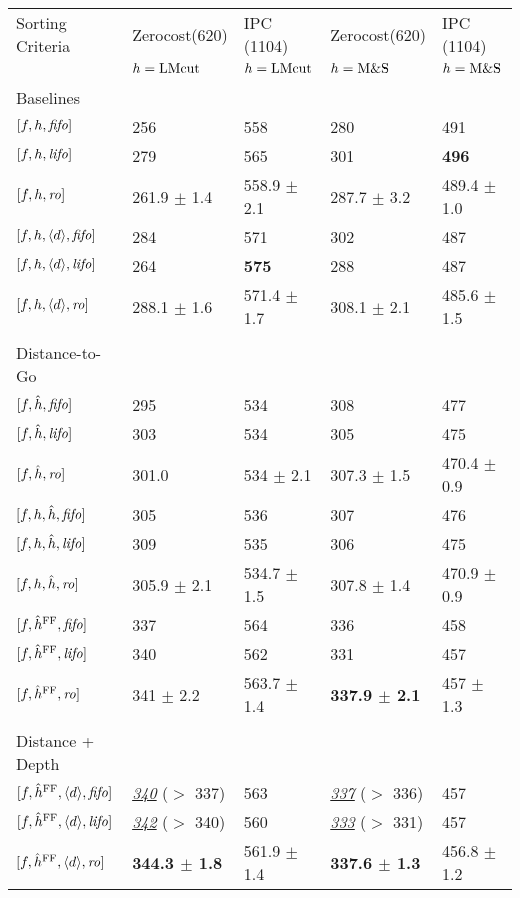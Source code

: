 \begin{center}
\begin{tabular}{|l|ll|ll|}
Sorting Criteria & Zerocost(620) & IPC (1104) & Zerocost(620) & IPC (1104)\\
 & \(h=\text{LMcut}\) & \(h=\text{LMcut}\) & \(h=\text{M\&S}\) & \(h=\text{M\&S}\)\\
 &  &  &  & \\
Baselines &  &  &  & \\
\([f,h,{\text{\textit{fifo}}}]\) & 256 & 558 & 280 & 491\\
\([f,h,{\text{\textit{lifo}}}]\) & 279 & 565 & 301 & \textbf{496}\\
\([f,h,{\text{\textit{ro}}}]\) & 261.9 \(\pm\) 1.4 & 558.9 \(\pm\) 2.1 & 287.7 \(\pm\) 3.2 & 489.4 \(\pm\) 1.0\\
\([f,h,{\left<d\right>},{\text{\textit{fifo}}}]\) & 284 & 571 & 302 & 487\\
\([f,h,{\left<d\right>},{\text{\textit{lifo}}}]\) & 264 & \textbf{575} & 288 & 487\\
\([f,h,{\left<d\right>},{\text{\textit{ro}}}]\) & 288.1 \(\pm\) 1.6 & 571.4 \(\pm\) 1.7 & 308.1 \(\pm\) 2.1 & 485.6 \(\pm\) 1.5\\
 &  &  &  & \\
Distance-to-Go &  &  &  & \\
\([f,\hat{h},{\text{\textit{fifo}}}]\) & 295 & 534 & 308 & 477\\
\([f,\hat{h},{\text{\textit{lifo}}}]\) & 303 & 534 & 305 & 475\\
\([f,\hat{h},{\text{\textit{ro}}}]\) & 301.0 & 534 \(\pm\) 2.1 & 307.3 \(\pm\) 1.5 & 470.4 \(\pm\) 0.9\\
\([f,h,\hat{h},{\text{\textit{fifo}}}]\) & 305 & 536 & 307 & 476\\
\([f,h,\hat{h},{\text{\textit{lifo}}}]\) & 309 & 535 & 306 & 475\\
\([f,h,\hat{h},{\text{\textit{ro}}}]\) & 305.9 \(\pm\) 2.1 & 534.7 \(\pm\) 1.5 & 307.8 \(\pm\) 1.4 & 470.9 \(\pm\) 0.9\\
\([f,\hat{h}^{\text{FF}},{\text{\textit{fifo}}}]\) & 337 & 564 & 336 & 458\\
\([f,\hat{h}^{\text{FF}},{\text{\textit{lifo}}}]\) & 340 & 562 & 331 & 457\\
\([f,\hat{h}^{\text{FF}},{\text{\textit{ro}}}]\) & 341 \(\pm\) 2.2 & 563.7 \(\pm\) 1.4 & \textbf{337.9 \(\pm\) 2.1} & 457 \(\pm\) 1.3\\
 &  &  &  & \\
Distance + Depth &  &  &  & \\
\([f,\hat{h}^{\text{FF}},{\left<d\right>},{\text{\textit{fifo}}}]\) & \uline{\emph{340}} (\(>\) 337) & 563 & \uline{\emph{337}} (\(>\) 336) & 457\\
\([f,\hat{h}^{\text{FF}},{\left<d\right>},{\text{\textit{lifo}}}]\) & \uline{\emph{342}} (\(>\) 340) & 560 & \uline{\emph{333}} (\(>\) 331) & 457\\
\([f,\hat{h}^{\text{FF}},{\left<d\right>},{\text{\textit{ro}}}]\) & \textbf{344.3 \(\pm\) 1.8} & 561.9 \(\pm\) 1.4 & \textbf{337.6 \(\pm\) 1.3} & 456.8 \(\pm\) 1.2\\
\end{tabular}
\end{center}

